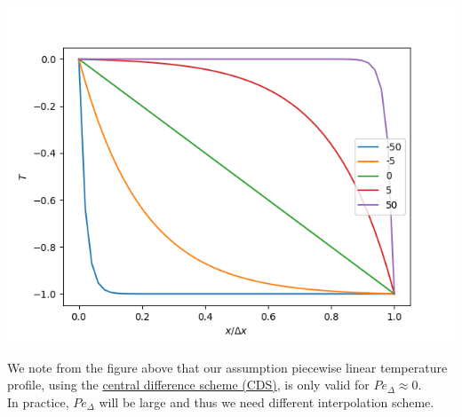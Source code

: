 \documentclass[11pt]{article}
\begin{document}
\begin{center}
\includegraphics[scale=0.8]{../pic/pectet_visual_pipe.png}
\end{center}
We note from the figure above that our assumption piecewise linear temperature profile, using
the \uline{central difference scheme (CDS)}, is only valid for \(Pe_\Delta \approx 0\). \\
In practice, \(Pe_\Delta\) will be large and thus we need different interpolation scheme. 
\end{document}
